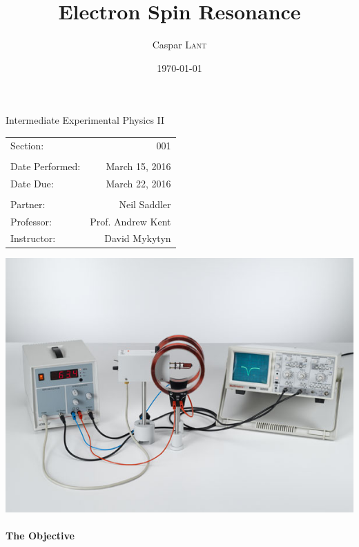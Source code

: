 \documentclass{amsart}
\title{Electron Spin Resonance}
\author{Caspar \textsc{Lant}} %
\date{\today} %
\begin{document}
\bigskip

\maketitle %
\begin{center}

Intermediate Experimental Physics II\\
\vspace{1.5cm}

\begin{tabular}{l r}

Section: & 001\\
\\
Date Performed: & March 15, 2016 \\ %
Date Due: & March 22, 2016\\
\\
Partner: & Neil Saddler\\ %
Professor: & Prof. Andrew Kent\\
Instructor: & David Mykytyn %
\end{tabular}
\vfill
\includegraphics[width=.7\textwidth]{diagram.jpg}
\end{center}
\vfill
\pagebreak

\paragraph{\textbf{The Objective} }
\end{document}

